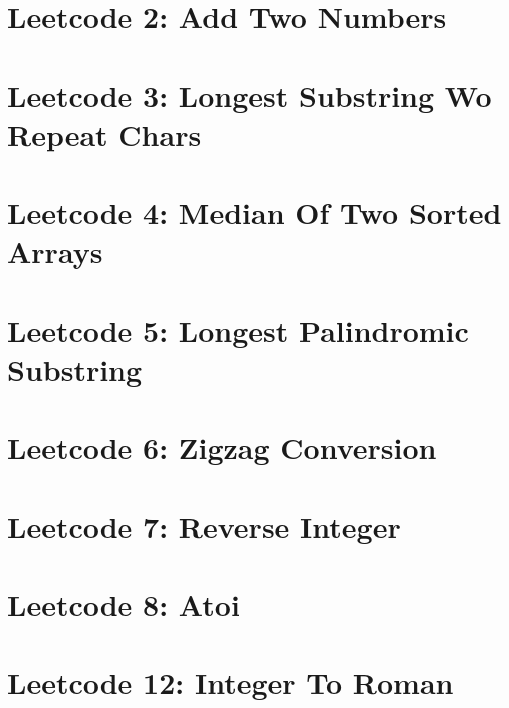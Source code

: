 \documentclass{article}
\begin{document}
%
\section*{Leetcode 2: Add Two Numbers}

\pagebreak 

\section*{Leetcode 3: Longest Substring Wo Repeat Chars}

\pagebreak 

\section*{Leetcode 4: Median Of Two Sorted Arrays}

\pagebreak 

\section*{Leetcode 5: Longest Palindromic Substring}

\pagebreak 

\section*{Leetcode 6: Zigzag Conversion}

\pagebreak 

\section*{Leetcode 7: Reverse Integer}

\pagebreak 

\section*{Leetcode 8: Atoi}

\pagebreak 

\section*{Leetcode 12: Integer To Roman}

\pagebreak 
\end{document}
